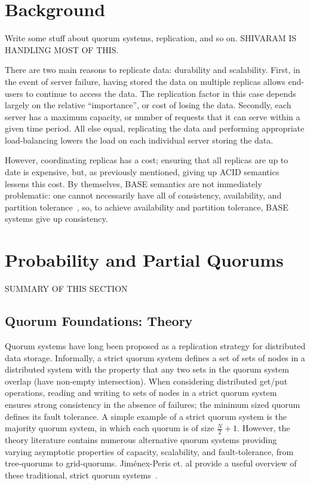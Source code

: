 \documentclass{vldb}
\begin{document}
\section{Background}

Write some stuff about quorum systems, replication, and so on.
SHIVARAM IS HANDLING MOST OF THIS.


There are two main reasons to replicate data: durability and
scalability.  First, in the event of server failure, having stored the
data on multiple replicas allows end-users to continue to access the
data.  The replication factor in this case depends largely on the
relative ``importance'', or cost of losing the data.  Secondly, each
server has a maximum capacity, or number of requests that it can serve within a
given time period.  All else equal, replicating the data and
performing appropriate load-balancing lowers the load on each
individual server storing the data.

However, coordinating replicas has a cost; ensuring that all replicas
are up to date is expensive, but, as previously mentioned, giving up
ACID semantics lessens this cost.  By themselves, BASE semantics are
not immediately problematic: one cannot necessarily have all of
consistency, availability, and partition tolerance~\cite{cap-proof},
so, to achieve availability and partition tolerance, BASE systems give
up consistency.


\section{Probability and Partial Quorums}
\label{sec:theory}

SUMMARY OF THIS SECTION

\subsection{Quorum Foundations: Theory}

Quorum systems have long been proposed as a replication strategy for
distributed data storage.  Informally, a strict quorum system defines
a set of sets of nodes in a distributed system with the property that
any two sets in the quorum system overlap (have non-empty
intersection).  When considering distributed get/put operations,
reading and writing to sets of nodes in a strict quorum system ensures
strong consistency in the absence of failures; the minimum sized
quorum defines its fault tolerance.  A simple example of a strict
quorum system is the majority quorum system, in which each quorum is
of size $\frac{N}{2}+1$.  However, the theory literature contains
numerous alternative quorum systems providing varying asymptotic
properties of capacity, scalability, and fault-tolerance, from
tree-quorums to grid-quorums.  Jim\'{e}nex-Peris et. al provide a
useful overview of these traditional, strict quorum
systems~\cite{quorums-alternative}.
\end{document}
